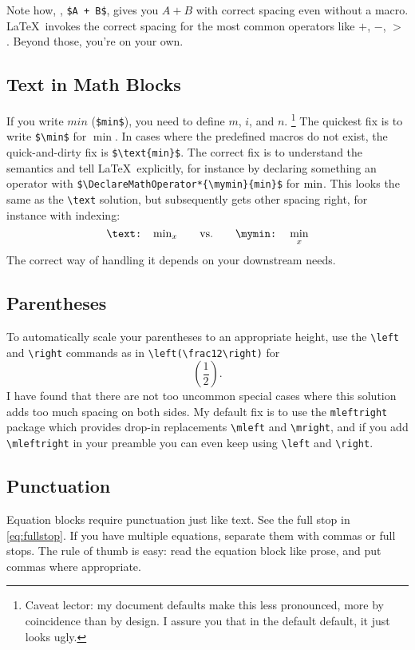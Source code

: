 Note how, \eg, \verb|$A + B$|, gives you $A+B$ with correct spacing even without a macro.
\LaTeX\ invokes the correct spacing for the most common operators like $+$, $-$, $>$ \etc.
Beyond those, you're on your own.

\subsection{Text in Math Blocks}
If you write $min$ (\verb|$min$|), you need to define $m$, $i$, and $n$.%
\footnote{
	Caveat lector: my document defaults make this less pronounced, more by coincidence than by design.
	I assure you that in the default default, it just looks ugly.
}
The quickest fix is to write \verb|$\min$| for $\min$.
In cases where the predefined macros do not exist, the quick-and-dirty fix is \verb|$\text{min}$|.
The correct fix is to understand the semantics and tell \LaTeX\ explicitly, for instance by declaring something an operator with \verb|$\DeclareMathOperator*{\mymin}{min}$| for $\mymin$.
This looks the same as the \verb|\text| solution, but subsequently gets other spacing right, for instance with indexing:
\begin{equation}
	\texttt{\textbackslash text: }\text{min}_x\qquad\text{\vs}\qquad\texttt{\textbackslash mymin: } \mymin_x
\end{equation}
The correct way of handling it depends on your downstream needs.

\subsection{Parentheses}
To automatically scale your parentheses to an appropriate height, use the \verb|\left| and \verb|\right| commands as in
\verb|\left(\frac12\right)| for
\begin{equation}\label{eq:fullstop}
	\left(\frac12\right).
\end{equation}
I have found that there are not too uncommon special cases where this solution adds too much spacing on both sides.
My default fix is to use the \verb|mleftright| package which provides drop-in replacements \verb|\mleft| and \verb|\mright|, and if you add \verb|\mleftright| in your preamble you can even keep using \verb|\left| and \verb|\right|.

\subsection{Punctuation}
Equation blocks require punctuation just like text.
See the full stop in \cref{eq:fullstop}.
If you have multiple equations, separate them with commas or full stops.
The rule of thumb is easy:
read the equation block like prose, and put commas where appropriate.